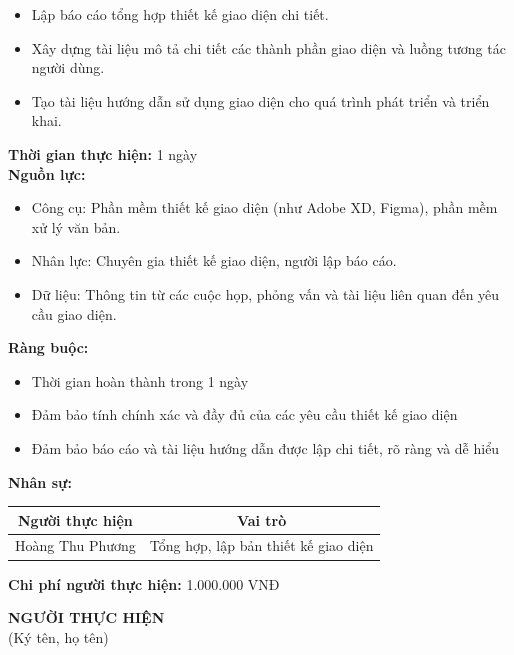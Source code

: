 {\begin{minipage}{\textwidth}
\begin{itemize}
        \item Lập báo cáo tổng hợp thiết kế giao diện chi tiết.
        \item Xây dựng tài liệu mô tả chi tiết các thành phần giao diện và luồng tương tác người dùng.
        \item Tạo tài liệu hướng dẫn sử dụng giao diện cho quá trình phát triển và triển khai.
    \end{itemize}
    \vspace{0.5cm}
    \noindent \textbf{Thời gian thực hiện:} 1 ngày \\
    \noindent \textbf{Nguồn lực:}
    \begin{itemize}
        \item Công cụ: Phần mềm thiết kế giao diện (như Adobe XD, Figma), phần mềm xử lý văn bản.
        \item Nhân lực: Chuyên gia thiết kế giao diện, người lập báo cáo.
        \item Dữ liệu: Thông tin từ các cuộc họp, phỏng vấn và tài liệu liên quan đến yêu cầu giao diện.
    \end{itemize}
    \vspace{0.5cm}
    \noindent \textbf{Ràng buộc:}
    \begin{itemize}
        \item Thời gian hoàn thành trong 1 ngày
        \item Đảm bảo tính chính xác và đầy đủ của các yêu cầu thiết kế giao diện
        \item Đảm bảo báo cáo và tài liệu hướng dẫn được lập chi tiết, rõ ràng và dễ hiểu
    \end{itemize}
    \vspace{0.5cm}
    \noindent \textbf{Nhân sự:}
    \begin{longtable}{|c|c|}
    \hline
    \textbf{Người thực hiện} & \textbf{Vai trò} \\
    \hline
    Hoàng Thu Phương & Tổng hợp, lập bản thiết kế giao diện \\
    \hline
    \end{longtable}
    \vspace{0.5cm}
    \noindent \textbf{Chi phí người thực hiện:} 1.000.000 VNĐ \\
    \vspace{1cm}
    \begin{flushleft}
        \hspace{8cm} \textbf{NGƯỜI THỰC HIỆN} \\
        \hspace{8.8cm} (Ký tên, họ tên) \\
        \vspace{1cm}
    \end{flushleft}
    \end{minipage}
}
% 
